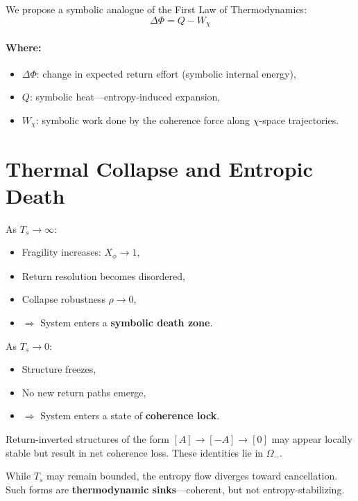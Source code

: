 We propose a symbolic analogue of the First Law of Thermodynamics:
\begin{equation} \label{eq:first-law}
\Delta \Phi = Q - W_\chi
\end{equation}

\paragraph{Where:}
\begin{itemize}
    \item $\Delta \Phi$: change in expected return effort (symbolic internal energy),
    \item $Q$: symbolic heat—entropy-induced expansion,
    \item $W_\chi$: symbolic work done by the coherence force along $\chi$-space trajectories.
\end{itemize}

\section{Thermal Collapse and Entropic Death} \label{thermal-collapse-and-entropic-death}

As $T_s \to \infty$:
\begin{itemize}
    \item Fragility increases: $X_\phi \to 1$,
    \item Return resolution becomes disordered,
    \item Collapse robustness $\rho \to 0$,
    \item $\Rightarrow$ System enters a \textbf{symbolic death zone}.
\end{itemize}

\medskip

As $T_s \to 0$:
\begin{itemize}
    \item Structure freezes,
    \item No new return paths emerge,
    \item $\Rightarrow$ System enters a state of \textbf{coherence lock}.
\end{itemize}

\medskip

Return-inverted structures of the form $[A] \to [-A] \to [0]$ may appear locally stable but result in net coherence loss. These identities lie in $\Omega_-$.

While $T_s$ may remain bounded, the entropy flow diverges toward cancellation. Such forms are \textbf{thermodynamic sinks}—coherent, but not entropy-stabilizing.

